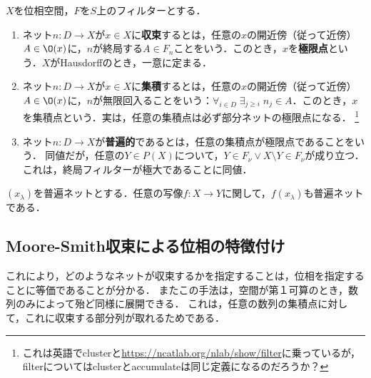 \documentclass[uplatex,dvipdfmx]{jsreport}
\begin{document}
\begin{definition}
    $X$を位相空間，$F$を$S$上のフィルターとする．
    \begin{enumerate}
        \item ネット$n:D\to X$が$x\in X$に\textbf{収束}するとは，任意の$x$の開近傍（従って近傍）$A\in\O(x)$に，$n$が終局する$A\in F_n$ことをいう．このとき，$x$を\textbf{極限点}という．$X$がHausdorffのとき，一意に定まる．
        \item ネット$n:D\to X$が$x\in X$に\textbf{集積}するとは，任意の$x$の開近傍（従って近傍）$A\in\O(x)$に，$n$が無限回入ることをいう：$\forall_{i\in D}\;\exists_{j\ge i}\;n_j\in A$．このとき，$x$を集積点という．実は，任意の集積点は必ず部分ネットの極限点になる．
        \footnote{これは英語でclusterと\url{https://ncatlab.org/nlab/show/filter}に乗っているが，filterについてはclusterとaccumulateは同じ定義になるのだろうか？}
        \item ネット$n:D\to X$が\textbf{普遍的}であるとは，任意の集積点が極限点であることをいう．
        同値だが，任意の$Y\in P(X)$について，$Y\in F_\nu\lor X\setminus Y\in F_\nu$が成り立つ．
        これは，終局フィルターが極大であることに同値．
    \end{enumerate}
\end{definition}

\begin{proposition}
    $(x_\lambda)$を普遍ネットとする．任意の写像$f:X\to Y$に関して，$f(x_\lambda)$も普遍ネットである．
\end{proposition}

\subsection{Moore-Smith収束による位相の特徴付け}

\begin{tcolorbox}[colframe=ForestGreen, colback=ForestGreen!10!white,breakable,colbacktitle=ForestGreen!40!white,coltitle=black,fonttitle=\bfseries\sffamily,
    title=]
    これにより，どのようなネットが収束するかを指定することは，位相を指定することに等価であることが分かる．
    またこの手法は，空間が第１可算のとき，数列のみによって殆ど同様に展開できる．
    これは，任意の数列の集積点に対して，これに収束する部分列が取れるためである．
\end{tcolorbox}
\end{document}
